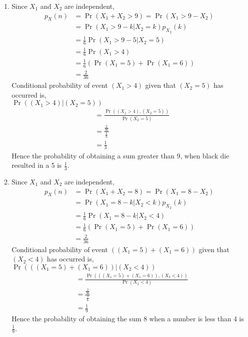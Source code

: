 \documentclass[10pt,twocolumn]{article}
\providecommand{\pr}[1]{\ensuremath{\Pr\left(#1\right)}}
\providecommand{\brak}[1]{\ensuremath{\left(#1\right)}}
\begin{document}
\begin{enumerate}
\item Since $X_1$ and $X_2$ are independent,
\begin{align}
p_X(n) &= \pr{X_1 + X_2 > 9} = \pr{X_1  > 9 -X_2} \\
&= \pr{X_1  > 9 -k | X_2 = k}p_{X_2}(k) \\
&= \frac{1}{6} \pr{X_1  > 9 -5 | X_2 = 5} \\
&= \frac{1}{6} \pr{X_1 > 4} \\
&= \frac{1}{6} (\pr{X_1 = 5} + \pr{X_1 = 6}) \\
&= \frac{2}{36}
\end{align}
Conditional probability of event $(X_1 > 4)$ given that $(X_2 = 5)$ has occurred is, \\
$\Pr{\brak{\brak{X_1 > 4}|\brak{X_2=5}}}$ 
\begin{align}
&=\frac{\Pr{((X_1 > 4),(X_2=5))}}{\Pr{\brak{X_2=5}}}\\
&=\frac{\frac{2}{36}}{\frac{1}{6}}\\
&=\frac{1}{3}
\end{align}  
Hence the probability of obtaining a sum greater than 9, when black die resulted in a 5 is $\frac{1}{3}$. 

\item Since $X_1$ and $X_2$ are independent,
\begin{align}
p_X(n) &= \pr{X_1 + X_2 = 8} = \pr{X_1  = 8 -X_2} \\
&= \pr{X_1  = 8 -k | X_2 < k}p_{X_2}(k) \\
&= \frac{1}{6} \pr{X_1  = 8 -k | X_2 < 4} \\
&= \frac{1}{6} (\pr{X_1 = 5} + \pr{X_1 = 6}) \\
&= \frac{2}{36}
\end{align}
Conditional probability of event $((X_1 = 5)+ (X_1 = 6))$ given that $(X_2 < 4)$ has occurred is, \\
$\Pr{\brak{\brak{(X_1 = 5) + (X_1 = 6)}|\brak{X_2<4}}}$ 
\begin{align}
&= \frac{\Pr{(((X_1 = 5) + (X_1 = 6)),(X_2 < 4))}}{\Pr{\brak{X_2 < 4}}} \\
&= \frac{\frac{2}{36}}{\frac{3}{6}}\\
&= \frac{1}{9}
\end{align} 
Hence the probability of obtaining the sum 8 when a number is less than 4 is $\frac{1}{9}$. 
\end{enumerate}
\end{document}
